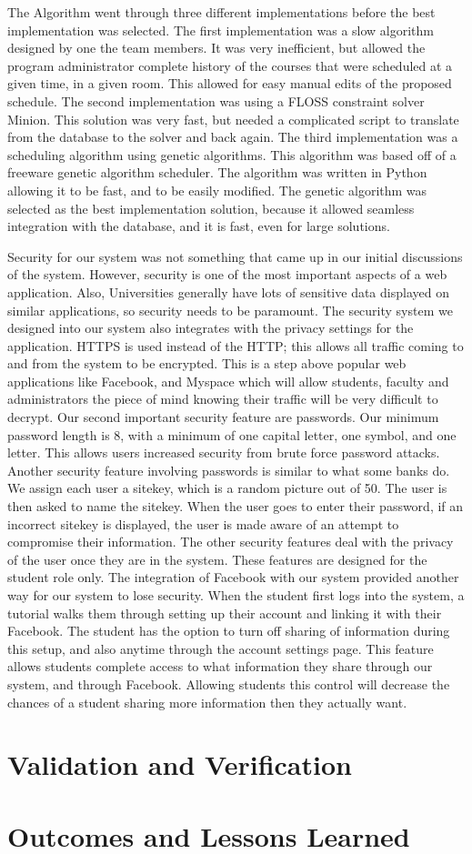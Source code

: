 \documentclass[12pt,article]{memoir}
\begin{document}
The Algorithm went through three different implementations before the best implementation was selected. The first implementation was a slow algorithm designed by one the team members. It was very inefficient, but allowed the program administrator complete history of the courses that were scheduled at a given time, in a given room. This allowed for easy manual edits of the proposed schedule. The second implementation was using a FLOSS constraint solver Minion. This solution was very fast, but needed a complicated script to translate from the database to the solver and back again. The third implementation was a scheduling algorithm using genetic algorithms. This algorithm was based off of a freeware genetic algorithm scheduler. The algorithm was written in Python allowing it to be fast, and to be easily modified. The genetic algorithm was selected as the best implementation solution, because it allowed seamless integration with the database, and it is fast, even for large solutions.

Security for our system was not something that came up in our initial discussions of the system. However, security is one of the most important aspects of a web application. Also, Universities generally have lots of sensitive data displayed on similar applications, so security needs to be paramount. The security system we designed into our system also integrates with the privacy settings for the application. HTTPS is used instead of the HTTP; this allows all traffic coming to and from the system to be encrypted. This is a step above popular web applications like Facebook, and Myspace which will allow students, faculty and administrators the piece of mind knowing their traffic will be very difficult to decrypt. Our second important security feature are passwords. Our minimum password length is 8, with a minimum of one capital letter, one symbol, and one letter. This allows users increased security from brute force password attacks. Another security feature involving passwords is similar to what some banks do. We assign each user a sitekey, which is a random picture out of 50. The user is then asked to name the sitekey. When the user goes to enter their password, if an incorrect sitekey is displayed, the user is made aware of an attempt to compromise their information. 
The other security features deal with the privacy of the user once they are in the system. These features are designed for the student role only. The integration of Facebook with our system provided another way for our system to lose security. When the student first logs into the system, a tutorial walks them through setting up their account and linking it with their Facebook. The student has the option to turn off sharing of information during this setup, and also anytime through the account settings page. This feature allows students complete access to what information they share through our system, and through Facebook. Allowing students this control will decrease the chances of a student sharing more information then they actually want.

\chapter{Validation and Verification} %
\chapter{Outcomes and Lessons Learned} %
\end{document}
